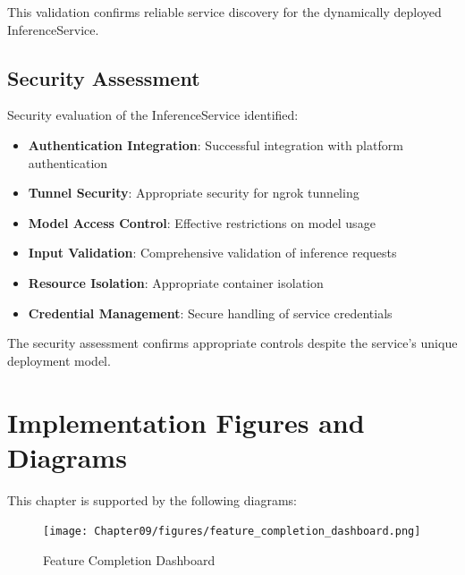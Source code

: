 This validation confirms reliable service discovery for the dynamically deployed InferenceService.

\subsection{Security Assessment}

Security evaluation of the InferenceService identified:

\begin{itemize}
    \item \textbf{Authentication Integration}: Successful integration with platform authentication
    \item \textbf{Tunnel Security}: Appropriate security for ngrok tunneling
    \item \textbf{Model Access Control}: Effective restrictions on model usage
    \item \textbf{Input Validation}: Comprehensive validation of inference requests
    \item \textbf{Resource Isolation}: Appropriate container isolation
    \item \textbf{Credential Management}: Secure handling of service credentials
\end{itemize}

The security assessment confirms appropriate controls despite the service's unique deployment model.

\section{Implementation Figures and Diagrams}

This chapter is supported by the following diagrams:


\begin{figure}[h]
\centering
\texttt{[image: Chapter09/figures/feature\_completion\_dashboard.png]}
\caption{Feature Completion Dashboard}
\label{fig:feature_completion}
\end{figure}

